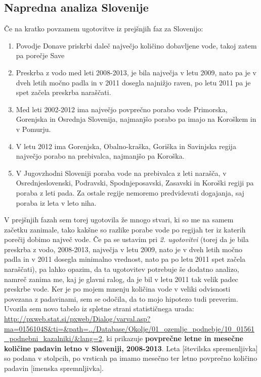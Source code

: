 \documentclass[11pt,a4paper]{article}
\begin{document}
\subsection{Napredna analiza Slovenije}

Če na kratko povzamem ugotovitve iz prejšnjih faz za Slovenijo:
\begin{enumerate} 
\item{Povodje Donave priskrbi daleč največjo količino dobavljene vode, takoj zatem pa porečje Save}
\item{Preskrba z vodo med leti 2008-2013, je bila največja v letu 2009, nato pa je v dveh letih močno padla in v 2011 dosegla najnižjo raven, po letu 2011 pa je spet začela preskrba naraščati.}
\item{Med leti 2002-2012 ima največjo povprečno porabo vode Primorska, Gorenjska in Osrednja Slovenija, najmanjšo porabo pa imajo na Ko\-ro\-škem in v Pomurju.}
\item{V letu 2012 ima Gorenjska, Obalno-kraška, Goriška in Savinjska regija največjo porabo na prebivalca, najmanjšo pa Koroška.}
\item{V Jugovzhodni Sloveniji poraba vode na prebivalca z leti narašča, v Osrednjeslovenski, Podravski, Spodnjeposavski, Zasavski in Koroški regiji pa poraba z leti pada. Za ostale regije nemoremo predvidevati dogajanja, saj poraba iz leta v leto niha.}
\end{enumerate}

V prejšnjih fazah sem torej ugotovila že mnogo stvari, ki so me na samem začetku zanimale, tako kakšne so razlike porabe vode po regijah ter iz katerih porečij dobimo največ vode. Če pa se ustavim pri \emph{2. ugotovitvi} (torej da je bila preskrba z vodo, 2008-2013, največja v letu 2009, nato je v dveh letih močno padla in v 2011 dosegla minimalno vrednost, nato pa po letu 2011 spet začela naraščati), pa lahko opazim, da ta ugotovitev potrebuje še dodatno analizo, namreč zanima me, kaj je glavni ralog, da je bil v letu 2011 tak velik padec preskrbe vode. Ker je po mojem mnenju količina vode v veliki odvisnosti povezana z padavinami, sem se odočila, da to mojo hipotezo tudi preverim. Uvozila sem novo tabelo iz spletne strani statističnega urada: \url{http://pxweb.stat.si/pxweb/Dialog/varval.asp?ma=0156104S&ti=&path=../Database/Okolje/01_ozemlje_podnebje/10_01561_podnebni_kazalniki/&lang=2}, ki prikazuje \textbf{povprečne letne in mesečne količine padavin letno v Sloveniji, 2008-2013}. Leta [številska spremenljivka] so podana v stolpcih, po vrsticah pa imamo mesečno ter letno povprečno količino padavin [imenska spremnljivka]. \\
\end{document}
